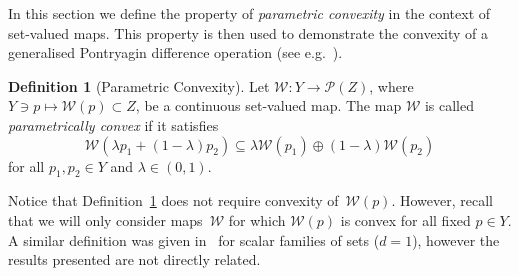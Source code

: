 \documentclass[final]{elsarticle}
\newcounter{thmcount}
\theoremstyle{remark}
\theoremstyle{definition}
\newtheorem{defi}[thmcount]{Definition}
\begin{document}
In this section we define the property of \emph{parametric convexity} in the context of set-valued maps. 
%
This property is then used to demonstrate the convexity of a generalised Pontryagin difference operation (see e.g.~\cite{Hadwiger:1950,blanchini:2007}). 
%
%
\begin{defi}[Parametric Convexity]\label{def:parametric:convexity}
Let $\mathcal W:Y\rightarrow \mathscr P(Z)$, where $Y\ni p\mapsto \mathcal W(p) \subset Z$, be a continuous set-valued map. The map $\mathcal W$ is called \emph{parametrically convex} if it satisfies
%
  \begin{equation}\label{eq:def:parametrically:convex}
  \mathcal W(\lambda p_1 + (1-\lambda)p_2)\subseteq\lambda \mathcal W(p_1) \oplus (1-\lambda) \mathcal W(p_2)
  \end{equation}
%
  for all $p_1,p_2\in Y$ and $\lambda\in (0,1)$.
\end{defi}
%
Notice that Definition~\ref{def:parametric:convexity} does not require convexity of~$\mathcal W(p)$. 
%
However, recall that we will only consider maps~$\mathcal W$ for which $\mathcal W(p)$ is convex for all fixed $p\in Y$.
%
A similar definition was given in~\cite{Hadwiger:1957} for scalar families of sets ($d=1$), however the results presented are not directly related.
\end{document}
